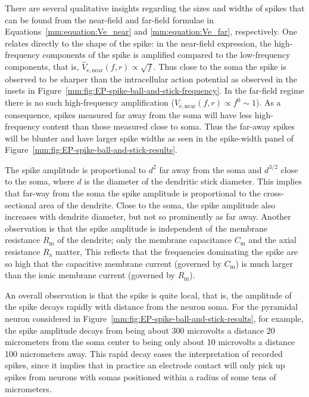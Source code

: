There are several qualitative insights regarding the sizes and widths of spikes that can 
be found from the near-field and far-field formulae in Equations~\ref{mm:equation:Ve_near} and 
\ref{mm:equation:Ve_far}, respectively. One relates directly to the shape of the spike:
in the near-field expression, the high-frequency components of the spike is amplified 
compared to the low-frequency components, that is, $\hat{V}_\mathrm{e,near}(f,r) \propto \sqrt{f}$.
Thus close to the soma the spike is observed to be sharper than the intracellular action potential
as observed in the insets in Figure~\ref{mm:fig:EP-spike-ball-and-stick-frequency}. 
In the far-field regime there is no such high-frequency amplification ($\hat{V}_\mathrm{e,near}(f,r) \propto f^0 \sim 1$).
As a consequence, spikes measured far away from the soma will have less high-frequency content than those measured close to soma.
Thus the far-away spikes will be blunter and have larger spike widths as seen in the spike-width panel of 
Figure~\ref{mm:fig:EP-spike-ball-and-stick-results}.

The spike amplitude is proportional to $d^{2}$ far away from the soma and $d^{3/2}$ close to the soma,
where $d$ is the diameter of the dendritic stick diameter.
This implies that far-way from the soma the spike amplitude is proportional to the cross-sectional area of the dendrite.
Close to the soma, the spike amplitude also increases with dendrite diameter, but not so prominently as far away.
Another observation is that the spike amplitude is independent of the membrane resistance $R_\mathrm{m}$ of the dendrite; only the membrane 
capacitance $C_\mathrm{m}$ and the axial resistance $R_\mathrm{a}$ matter, 
This reflects that the frequencies dominating the spike are so high that the capacitive membrane current 
(governed by $C_\mathrm{m}$) is much larger than the ionic membrane current  (governed by $R_\mathrm{m}$). 

An overall observation is that the spike is quite local, that is, the amplitude of the spike decays rapidly with distance from the neuron soma. For the pyramidal neuron considered in 
Figure~\ref{mm:fig:EP-spike-ball-and-stick-results}, for example, the spike amplitude decays from being about
300 microvolts a distance 20 micrometers from the soma center to being only about 10 microvolts a
distance 100 micrometers away. This rapid decay eases the interpretation of recorded spikes, since it implies
that in practice an electrode contact will only pick up spikes from neurons with somas positioned within a radius of some tens of micrometers.

